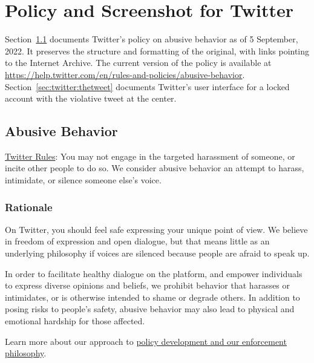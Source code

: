 
\section{Policy and Screenshot for Twitter}
\label{sec:twitter:sources}

Section~\ref{sec:twitter:abusivebehavior} documents Twitter's policy on abusive
behavior as of 5 September, 2022. It preserves the structure and formatting of
the original, with links pointing to the Internet Archive. The current version
of the policy is available at
\url{https://help.twitter.com/en/rules-and-policies/abusive-behavior}.
Section~\ref{sec:twitter:thetweet} documents Twitter's user interface for a
locked account with the violative tweet at the center.


\subsection{Abusive Behavior}
\label{sec:twitter:abusivebehavior}

\noindent\href{https://web.archive.org/web/20220905021323/https://help.twitter.com/en/rules-and-policies/twitter-rules.html}{Twitter
Rules}: You may not engage in the targeted harassment of someone, or incite
other people to do so. We consider abusive behavior an attempt to harass,
intimidate, or silence someone else's voice.


\subsubsection{Rationale}

On Twitter, you should feel safe expressing your unique point of view. We
believe in freedom of expression and open dialogue, but that means little as an
underlying philosophy if voices are silenced because people are afraid to speak
up.

In order to facilitate healthy dialogue on the platform, and empower individuals
to express diverse opinions and beliefs, we prohibit behavior that harasses or
intimidates, or is otherwise intended to shame or degrade others. In addition to
posing risks to people's safety, abusive behavior may also lead to physical and
emotional hardship for those affected.

Learn more about our approach to
\href{https://web.archive.org/web/20220905021323/https://help.twitter.com/en/rules-and-policies/enforcement-philosophy.html}{policy
development and our enforcement philosophy}.


